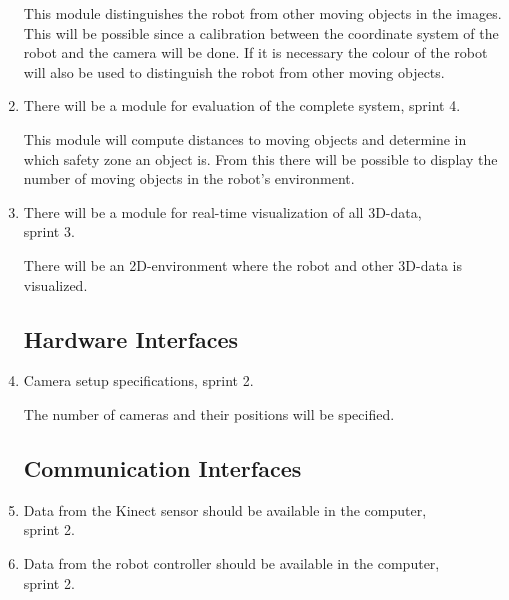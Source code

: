 \documentclass[10pt,a4paper]{article}
\begin{document}
\begin{enumerate}
{\addtolength{\leftskip}{5mm}This module distinguishes the robot from other moving objects in the images. This will be possible since a calibration between the coordinate system of the robot and the camera will be done. If it is necessary the colour of the robot will also be used to distinguish the robot from other moving objects.\par}


\item There will be a module for evaluation of the complete system, sprint 4.

{\addtolength{\leftskip}{5mm}This module will compute distances to moving objects and determine in which safety zone an object is. From this there will be possible to display the number of moving objects in the robot's environment. 
\par}

%

\item There will be a module for real-time visualization of all 3D-data,\\ sprint 3.

{\addtolength{\leftskip}{5mm}There will be an 2D-environment where the robot and other 3D-data is visualized.\par}

\subsection{Hardware Interfaces}

\item Camera setup specifications, sprint 2.

{\addtolength{\leftskip}{5mm} The number of cameras and their positions will be specified.\par}

\subsection{Communication Interfaces}

\item Data from the Kinect sensor should be available in the computer, \\sprint 2.
\item Data from the robot controller should be available in the computer, \\sprint 2.


\end{enumerate}
\end{document}

